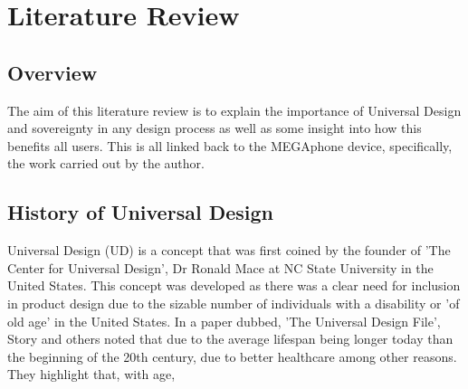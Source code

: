 
\chapter{Literature Review} %

\label{Chapter2} %


\section{Overview}  
The aim of this literature review is to explain the importance of Universal Design and sovereignty in any design process as well as some insight into how this benefits all users. 
This is all linked back to the MEGAphone device, specifically, the work carried out by the author.


\section{History of Universal Design}
Universal Design (UD) is a concept that was first coined by the founder of 'The Center for Universal Design', Dr Ronald Mace at NC State University in the United States\cite{ronald}.
This concept was developed as there was a clear need for inclusion in product design due to the sizable number of individuals with a disability or 'of old age' in the United States. %
In a paper dubbed, 'The Universal Design File'\cite{universalfile}, Story and others noted that due to the average lifespan being longer today than the beginning of the 20th century, due to better healthcare among other reasons.
They highlight that, with age,


